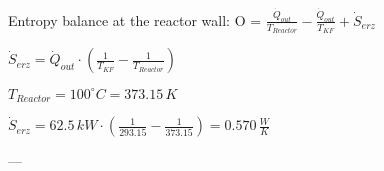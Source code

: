 Entropy balance at the reactor wall:  
O = \( \frac{\dot{Q}_{out}}{T_{Reactor}} - \frac{\dot{Q}_{out}}{T_{KF}} + \dot{S}_{erz} \)  

\( \dot{S}_{erz} = \dot{Q}_{out} \cdot \left( \frac{1}{T_{KF}} - \frac{1}{T_{Reactor}} \right) \)  

\( T_{Reactor} = 100^\circ C = 373.15 \, K \)  

\( \dot{S}_{erz} = 62.5 \, kW \cdot \left( \frac{1}{293.15} - \frac{1}{373.15} \right) = 0.570 \, \frac{W}{K} \)  

---